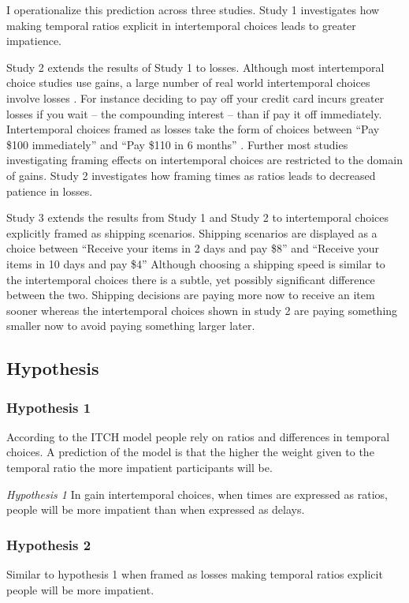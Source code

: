 \documentclass[]{article}
\begin{document}
I operationalize this prediction across three studies.
Study 1 investigates how making temporal ratios explicit in intertemporal choices leads to greater impatience. 

Study 2 extends the results of Study 1 to losses. 
Although most intertemporal choice studies use gains, a large number of real world intertemporal choices involve losses \cite{Hardisty2013}. 
For instance deciding to pay off your credit card incurs greater losses if you wait -- the compounding interest -- than if pay it off immediately.
Intertemporal choices framed as losses take the form of choices between ``Pay \$100 immediately'' and  ``Pay \$110 in 6 months'' \cite{Hardisty2015}.
Further most studies investigating framing effects on intertemporal choices are restricted to the domain of gains. 
Study 2 investigates how framing times as ratios leads to decreased patience in losses. 

Study 3 extends the results from Study 1 and Study 2 to intertemporal choices explicitly framed as shipping scenarios.
Shipping scenarios are displayed as a choice between ``Receive your items in 2 days and pay \$8'' and ``Receive your items in 10 days and pay \$4''
Although choosing a shipping speed is similar to the intertemporal choices there is a subtle, yet possibly significant difference between the two.
Shipping decisions are paying more now to receive an item sooner whereas the intertemporal choices shown in study 2 are paying something smaller now to avoid paying something larger later. 


\subsection{Hypothesis}

\subsubsection{Hypothesis 1}
According to the ITCH model people rely on ratios and differences in temporal choices. 
A prediction of the model is that the higher the weight given to the temporal ratio the more impatient participants will be.

\textit{Hypothesis 1} In gain intertemporal choices, when times are expressed as ratios, people will be more impatient than when expressed as delays. 

\subsubsection{Hypothesis 2}
Similar to hypothesis 1 when framed as losses making temporal ratios explicit people will be more impatient. 
\end{document}
